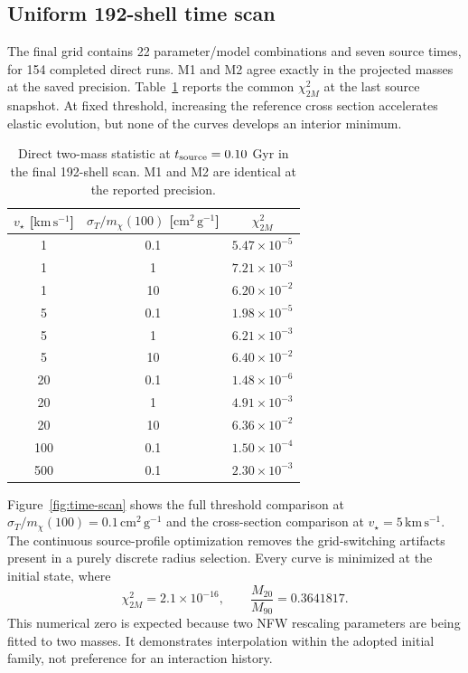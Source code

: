 \documentclass[12pt]{article}
\newcommand{\sigmavm}{\sigma_T/m_\chi}
\newcommand{\vstar}{v_\star}
\begin{document}
\subsection{Uniform 192-shell time scan}

The final grid contains 22 parameter/model combinations and seven source
times, for 154 completed direct runs.  M1 and M2 agree exactly in the projected
masses at the saved precision.  Table~\ref{tab:final-time} reports the common
$\chi^2_{2M}$ at the last source snapshot.  At fixed threshold, increasing the
reference cross section accelerates elastic evolution, but none of the
curves develops an interior minimum.

\begin{table}[t]
\centering
\caption{Direct two-mass statistic at $t_{\rm source}=0.10$ Gyr in the final
192-shell scan.  M1 and M2 are identical at the reported precision.}
\label{tab:final-time}
\begin{tabular}{ccc}
\toprule
$\vstar$ [$\mathrm{km\,s^{-1}}$] & $\sigmavm(100)$ [$\mathrm{cm^2\,g^{-1}}$] & $\chi^2_{2M}$\\
\midrule
1   & 0.1 & $5.47\times10^{-5}$\\
1   & 1   & $7.21\times10^{-3}$\\
1   & 10  & $6.20\times10^{-2}$\\
5   & 0.1 & $1.98\times10^{-5}$\\
5   & 1   & $6.21\times10^{-3}$\\
5   & 10  & $6.40\times10^{-2}$\\
20  & 0.1 & $1.48\times10^{-6}$\\
20  & 1   & $4.91\times10^{-3}$\\
20  & 10  & $6.36\times10^{-2}$\\
100 & 0.1 & $1.50\times10^{-4}$\\
500 & 0.1 & $2.30\times10^{-3}$\\
\bottomrule
\end{tabular}
\end{table}

Figure~\ref{fig:time-scan} shows the full threshold comparison at
$\sigmavm(100)=0.1\,\mathrm{cm^2\,g^{-1}}$ and the cross-section comparison at
$\vstar=5\,\mathrm{km\,s^{-1}}$.  The continuous source-profile optimization
removes the grid-switching artifacts present in a purely discrete radius
selection.  Every curve is minimized at the initial state, where
\begin{equation}
  \chi^2_{2M}=2.1\times10^{-16},\qquad
  \frac{M_{20}}{M_{90}}=0.3641817.
  \label{eq:best-fit}
\end{equation}
This numerical zero is expected because two NFW rescaling parameters are
being fitted to two masses.  It demonstrates interpolation within the adopted
initial family, not preference for an interaction history.
\end{document}
